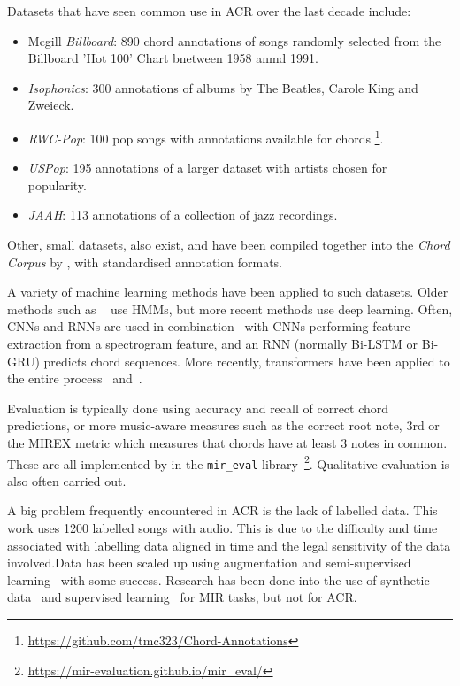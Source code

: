 Datasets that have seen common use in ACR over the last decade include:
\begin{itemize}
    \item Mcgill \emph{Billboard}: 890 chord annotations of songs randomly selected from the Billboard 'Hot 100' Chart bnetween 1958 anmd 1991.~\citep{McgillBillboard}
    \item \emph{Isophonics}: 300 annotations of albums by The Beatles, Carole King and Zweieck.~\citep{Isophonics}
    \item \emph{RWC-Pop}: 100 pop songs with annotations available for chords \footnote{\url{https://github.com/tmc323/Chord-Annotations}}.~\citep{RWC}
    \item \emph{USPop}: 195 annotations of a larger dataset with artists chosen for popularity.~\citep{USPop}
    \item \emph{JAAH}: 113 annotations of a collection of jazz recordings.~\cite{JAAH}
\end{itemize}

Other, small datasets, also exist, and have been compiled together into the \emph{Chord Corpus} by \citet{Choco}, with standardised annotation formats.

A variety of machine learning methods have been applied to such datasets. Older methods such as ~\cite{ACRHMM} use HMMs, but more recent methods use deep learning. Often, CNNs and RNNs are used in combination~\citep{ACRCNNRNN1,ACRLargeVocab1,ACRLargeVocab2} with CNNs performing feature extraction from a spectrogram feature, and an RNN (normally Bi-LSTM or Bi-GRU) predicts chord sequences. More recently, transformers have been applied to the entire process~\citet{MelodyTranscriptionViaGenerativePreTraining} and~\citet{HarmonyTransformer}.

Evaluation is typically done using accuracy and recall of correct chord predictions, or more music-aware measures such as the correct root note, 3rd or the MIREX metric which measures that chords have at least 3 notes in common. These are all implemented by \citet{MIREVAL} in the \texttt{mir\_eval} library~\footnote{\url{https://mir-evaluation.github.io/mir_eval/}}. Qualitative evaluation is also often carried out.

A big problem frequently encountered in ACR is the lack of labelled data. This work uses 1200 labelled songs with audio. This is due to the difficulty and time associated with labelling data aligned in time and the legal sensitivity of the data involved.Data has been scaled up using augmentation and semi-supervised learning~\citep{ScalingUpSemiSupervisedLearning} with some success. Research has been done into the use of synthetic data~\citep{MusicGenTrainingData,AnnotationFreeSyntheticData} and supervised learning~\citep{MERTSupervisedLearning} for MIR tasks, but not for ACR.

